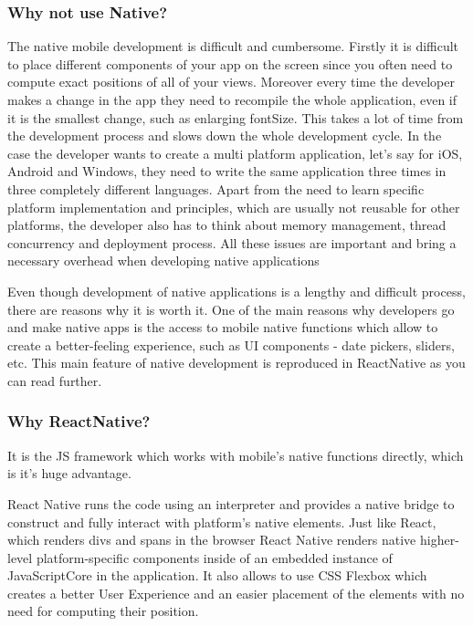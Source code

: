 \documentclass[thesis=M,english]{FITthesis}[2012/10/20]
\begin{document}
\subsubsection{Why not use Native?}
The native mobile development is difficult and cumbersome. Firstly it is difficult to place different components of your app on the screen since you often need to compute exact positions of all of your views. Moreover every time the developer makes a change in the app they need to recompile the whole application, even if it is the smallest change, such as enlarging fontSize. This takes a lot of time from the development process and slows down the whole development cycle. In the case the developer wants to create a multi platform application, let's say for iOS, Android and Windows, they need to write the same application three times in three completely different languages. Apart from the need to learn specific platform implementation and principles, which are usually not reusable for other platforms, the developer also has to think about memory management, thread concurrency and deployment process. All these issues are important and bring a necessary overhead when developing native applications

Even though development of native applications is a lengthy and difficult process, there are reasons why it is worth it. One of the main reasons why developers go and make native apps is the access to mobile native functions which allow to create a better-feeling experience, such as UI components - date pickers, sliders, etc. This main feature of native development is reproduced in ReactNative as you can read further.\cite{react-fb-native}

\subsubsection{Why ReactNative?}

It is the JS framework which works with mobile's native functions directly, which is it's huge advantage.

React Native runs the code using an interpreter and provides a native bridge to construct and fully interact with platform's native elements. Just like React, which renders divs and spans in the browser React Native renders native higher-level platform-specific components inside of an embedded instance of JavaScriptCore in the application. It also allows to use CSS Flexbox which creates a better User Experience and an easier placement of the elements with no need for computing their position.
\end{document}
